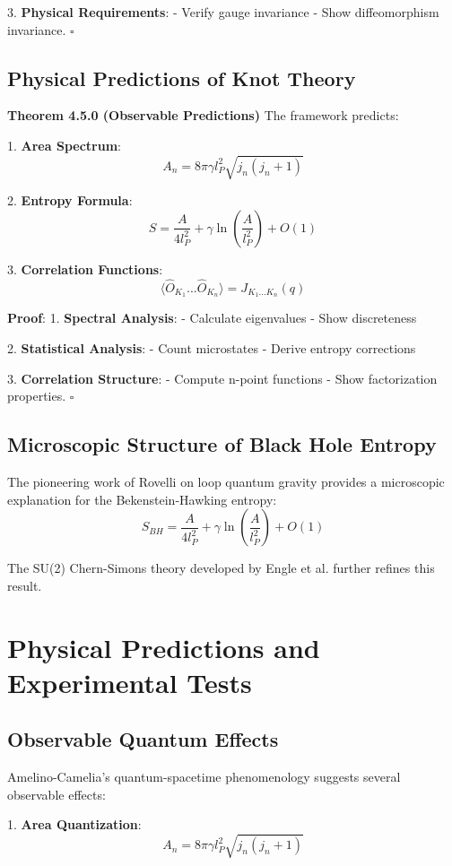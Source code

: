 \documentclass[12pt,a4paper]{article}
\begin{document}
3. \textbf{Physical Requirements}:
   - Verify gauge invariance
   - Show diffeomorphism invariance. $\square$

\subsection{Physical Predictions of Knot Theory}

\textbf{Theorem 4.5.0 (Observable Predictions)}
The framework predicts:

1. \textbf{Area Spectrum}:
   \[
   A_n = 8\pi\gamma l_P^2\sqrt{j_n(j_n+1)}
   \]

2. \textbf{Entropy Formula}:
   \[
   S = \frac{A}{4l_P^2} + \gamma\ln(\frac{A}{l_P^2}) + O(1)
   \]

3. \textbf{Correlation Functions}:
   \[
   \langle\hat{O}_{K_1}...\hat{O}_{K_n}\rangle = J_{K_1...K_n}(q)
   \]

\textbf{Proof}:
1. \textbf{Spectral Analysis}:
   - Calculate eigenvalues
   - Show discreteness

2. \textbf{Statistical Analysis}:
   - Count microstates
   - Derive entropy corrections

3. \textbf{Correlation Structure}:
   - Compute n-point functions
   - Show factorization properties. $\square$

\subsection{Microscopic Structure of Black Hole Entropy}
The pioneering work of Rovelli\cite{rovelli1996black} on loop quantum gravity provides a microscopic explanation for the Bekenstein-Hawking entropy:
\[
S_{BH} = \frac{A}{4l_P^2} + \gamma\ln(\frac{A}{l_P^2}) + O(1)
\]

The SU(2) Chern-Simons theory developed by Engle et al.\cite{engle2010black} further refines this result.

\section{Physical Predictions and Experimental Tests}

\subsection{Observable Quantum Effects}
Amelino-Camelia's quantum-spacetime phenomenology\cite{amelino2013quantum} suggests several observable effects:

1. \textbf{Area Quantization}:
   \[
   A_n = 8\pi\gamma l_P^2\sqrt{j_n(j_n+1)}
   \]
\end{document}

